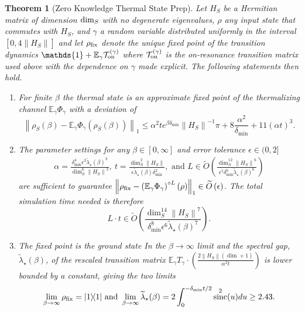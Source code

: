 \documentclass[
 amsmath,amssymb,
 aps,
onecolumn, 
nofootinbib]{revtex4-2}
\newtheorem{theorem}{Theorem}
\newcommand{\on}{\rm on}
\newcommand{\ketbra}[2]{| #1\rangle\! \langle #2|}
\newcommand{\norm}[1]{\left\| #1 \right\|}
\newcommand{\EE}{\mathbb{E}}
\newcommand{\TT}{\mathcal{T}}
\newcommand{\bigotilde}[1]{\widetilde{O} \left( #1 \right)}
\newcommand{\identity}{\mathds{1}}
\DeclareMathOperator{\sinc}{sinc}
\begin{document}
\begin{theorem}[Zero Knowledge Thermal State Prep] \label{thm:zero_knowledge}
    Let $H_S$ be a Hermitian matrix of dimension ${\rm dim}_S$ with no degenerate eigenvalues, $\rho$ any input state that commutes with $H_S$, and $\gamma$ a random variable distributed uniformly in the interval $[0, 4 \norm{H_S}]$ and
    let $\rho_{\rm fix}$ denote the unique fixed point of the transition dynamics $\identity + \EE_\gamma \TT_{\on}^{(\gamma)}$ where $\TT_{\on}^{(\gamma)}$ is the on-resonance transition matrix used above with the dependence on $\gamma$ made explicit. The following statements then hold.
    \begin{enumerate}
\item For finite $\beta$ the thermal state is an approximate fixed point of the thermalizing channel $\EE_\gamma \Phi_\gamma$ with a deviation of
    \begin{equation}
        \norm{\rho_S(\beta) - \EE_\gamma \Phi_\gamma(\rho_S(\beta))}_1 \le \alpha^2 t e^{\beta \delta_{\min}} \norm{H_S}^{-1} \pi + 8 \frac{\alpha^2}{\delta_{\min}} + 11 (\alpha t)^3.
    \end{equation}
    \item   The parameter settings for any $\beta\in [0,\infty]$ and error tolerance $\epsilon \in (0,2]$
    \begin{align}
        \alpha = \frac{\delta_{\min}^4 \epsilon^{3} \widetilde{\lambda}_\star(\beta)^{3}}{\dim_S^6 \norm{H_S}^3}, ~t = \frac{\dim_S^2 \norm{H_S}}{\epsilon \widetilde{\lambda}_\star(\beta) \delta_{\min}^2}, \text{ and } L \in \bigotilde{\frac{\dim_S^{12} \norm{H_S}^6}{\epsilon^5 \delta_{\min}^6 \widetilde{\lambda}_\star(\beta)^{6} }}
    \end{align}
    are sufficient to guarantee $\norm{\rho_{\rm fix} - \left(\EE_\gamma \Phi_\gamma \right)^{\circ L}(\rho)}_1 \in \bigotilde{\epsilon}$.
    The total simulation time needed is therefore
    \begin{equation}
        L \cdot t \in \bigotilde{\frac{\dim_S^{14} \norm{H_S}^7}{\delta_{\min}^8 \epsilon^6 \widetilde{\lambda}_\star(\beta)^7}}.
    \end{equation}
   \item    The fixed point is the ground state In the $\beta \to \infty$ limit and the spectral gap, $\widetilde{\lambda}_\star(\beta)$, of the rescaled transition matrix $\EE_\gamma T_\gamma \cdot \left(\frac{2 \norm{H_S} (\dim + 1)}{\alpha^2 t}\right)$ is lower bounded by a constant, giving the two limits
    \begin{equation}
        \lim_{\beta \to \infty} \rho_{\rm fix} = \ketbra{1}{1} \text{ and } \lim_{\beta \to \infty} \widetilde{\lambda}_\star(\beta) = 2 \int_{0}^{-\delta_{\min}t/2} \sinc^2(u) du \ge 2.43.
        \end{equation}

    \end{enumerate}
\end{theorem}
\end{document}
